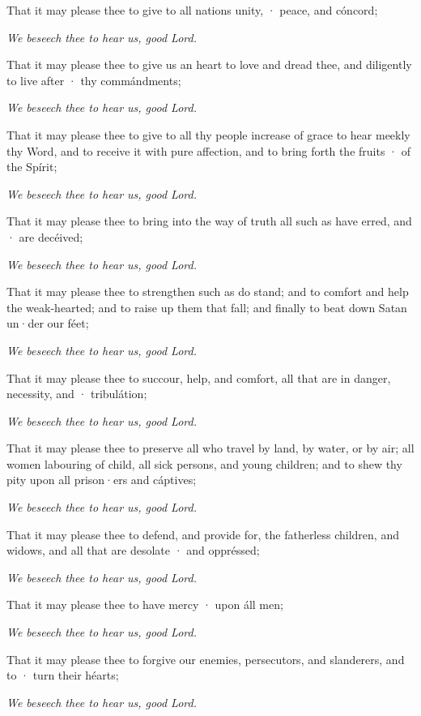 That it may please thee to give to all nations unity, · peace, and cóncord;

\centerline{\emph{We beseech thee to hear us, good Lord.}}

That it may please thee to give us an heart to love and dread thee, and diligently to live after · thy commándments;

\centerline{\emph{We beseech thee to hear us, good Lord.}}

That it may please thee to give to all thy people increase of grace to hear meekly thy Word, and to receive it with pure affection, and to bring forth the fruits · of the Spírit;

\centerline{\emph{We beseech thee to hear us, good Lord.}}

That it may please thee to bring into the way of truth all such as have erred, and · are decéived;

\centerline{\emph{We beseech thee to hear us, good Lord.}}

That it may please thee to strengthen such as do stand; and to comfort and help the weak-hearted; and to raise up them that fall; and finally to beat down Satan un·der our féet;

\centerline{\emph{We beseech thee to hear us, good Lord.}}

That it may please thee to succour, help, and comfort, all that are in danger, necessity, and · tribulátion;

\centerline{\emph{We beseech thee to hear us, good Lord.}}

That it may please thee to preserve all who travel by land, by water, or by air; all women labouring of child, all sick persons, and young children; and to shew thy pity upon all prison·ers and cáptives; 

\centerline{\emph{We beseech thee to hear us, good Lord.}}

That it may please thee to defend, and provide for, the fatherless children, and widows, and all that are desolate · and oppréssed;

\centerline{\emph{We beseech thee to hear us, good Lord.}}

That it may please thee to have mercy · upon áll men;

\centerline{\emph{We beseech thee to hear us, good Lord.}}

That it may please thee to forgive our enemies, persecutors, and slanderers, and to · turn their héarts;

\centerline{\emph{We beseech thee to hear us, good Lord.}}

